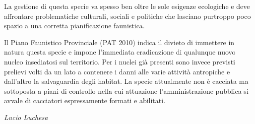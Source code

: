 \begin{multicols}{2}
La gestione di questa specie va spesso ben oltre le sole esigenze
ecologiche e deve affrontare problematiche culturali, sociali e
politiche che lasciano purtroppo poco spazio a una corretta
pianificazione faunistica.

Il Piano Faunistico Provinciale (PAT 2010) indica il divieto di
immettere in natura questa specie e impone l{\textquoteright}immediata
eradicazione di qualunque nuovo nucleo insediatosi sul territorio. Per
i nuclei gi\`a presenti sono invece previsti prelievi volti da un lato
a contenere i danni alle varie attivit\`a antropiche e
dall{\textquoteright}altro la salvaguardia degli habitat. La specie
attualmente non \`e cacciata ma sottoposta a piani di controllo nella
cui attuazione l{\textquoteright}amministrazione pubblica si avvale di
cacciatori espressamente formati e abilitati. 

\medskip
\medskip

{\raggedleft\itshape
Lucio Luchesa
}
\end{multicols}